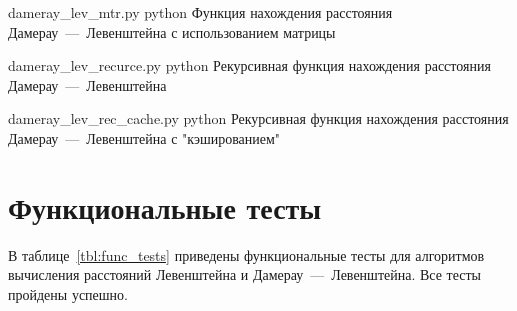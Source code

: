 	

\newpage
{}
	{dameray_lev_mtr.py} %
	{python} %
	{Функция нахождения расстояния Дамерау~---~Левенштейна с использованием матрицы} %
	

\newpage
{}
	{dameray_lev_recurce.py} %
	{python} %
	{Рекурсивная функция нахождения расстояния Дамерау~---~Левенштейна} %


\newpage
{}
	{dameray_lev_rec_cache.py} %
	{python} %
	{Рекурсивная функция нахождения расстояния Дамерау~---~Левенштейна с "кэшированием"} %

\section{Функциональные тесты}

В таблице~\ref{tbl:func_tests} приведены функциональные тесты для алгоритмов вычисления расстояний Левенштейна и Дамерау~---~Левенштейна. 
Все тесты пройдены успешно.


